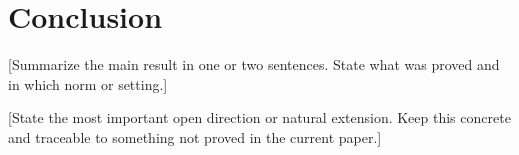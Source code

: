 \section{Conclusion}\label{sec:conclusion}

[Summarize the main result in one or two sentences. State what was proved
and in which norm or setting.]

[State the most important open direction or natural extension. Keep this
concrete and traceable to something not proved in the current paper.]
